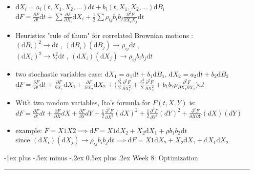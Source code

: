 \documentclass[10pt,landscape,a4paper]{article}
\makeatletter
\renewcommand{\section}{\@startsection{section}{1}{0mm}%
                                {-1ex plus -.5ex minus -.2ex}%
                                {0.5ex plus .2ex}%
                                {\normalfont\large\bfseries}}
\makeatother
\begin{document}
\begin{multicols*}{3}
\begin{description}[topsep=0pt]
	\item[It\^{o}'s lemma: multiple stochastic variables] ~
	\begin{itemize}[topsep=0pt]
		\item  $ \text{d}X_i = a_i(t,X_1,X_2,...) \text{d}t+  b_i(t,X_1,X_2,...)\text{d} B_i $ \\
		 $\text{d} F = \frac{\partial F}{\partial t} \text{d}t + \sum \frac{\partial F}{\partial X_i} \text{d}X_i + \frac{1}{2} \sum \rho_{ij} b_i b_j \frac{\partial ^2 F}{\partial X_i X_j} \text{d}t$ 
		 \item Heuristics "rule of thum" for correlated Brownian motions : \\
		    $ (\text{d}B_i)^2 \rightarrow \text{d}t $ , 
		    $ (\text{d}B_i)(\text{d}B_j) \rightarrow \rho_{ij} \text{d}t$ ,\\ 
		    $ (\text{d}X_i )^2 \rightarrow b^2_i \text{d}t $ ,
		    $ (\text{d}X_i)(\text{d}X_j) \rightarrow \rho_{ij} b_i b_j \text{d} t $ 
		\item two stochastic variables case:  $\text{d}X_1 = a_1 \text{d}t + b_1 \text{d}B_1 $, $\text{d}X_2   = a_2 \text{d}t + b_2 \text{d}B_2 $ \\
			 $\text{d}F =  \frac{\partial F}{\partial t} \text{d}t + \frac{\partial F}{\partial X_1} \text{d}X_1+  \frac{\partial F}{\partial X_2} \text{d}X_2 + \Big( \frac{b_1^2}{2}  \frac{\partial^2 F}{\partial X_1^2} + \frac{b_2^2}{2}  \frac{\partial^2 F}{\partial X_2^2} + b_1 b_2 \rho \frac{\partial^2 F}{\partial X_1 \partial X_2} \Big) \text{d}t $
		 \item With two random variables, Ito's formula for $F(t, X, Y)$ is:
			$dF = \frac{\partial F}{\partial t} dt + \frac{\partial F}{\partial X} dX + \frac{\partial F}{\partial Y} dY + \frac{1}{2} \frac{\partial^2 F}{\partial X^2} (dX)^2  +  \frac{1}{2} \frac{\partial^2 F}{\partial Y^2} (dY)^2 + \frac{\partial^2 F}{\partial X \partial Y} (dX)(dY)
			$
		 \item example: $F=X1X2 \implies \text{d}F = X1 \text{d} X_2 + X_2 \text{d} X_1 + \rho b_1 b_2 \text{d} t $ \\
		 since $(\text{d}X_i)(\text{d}X_j) \rightarrow \rho_{ij} b_i b_j \text{d} t \implies \text{d}F = X1 \text{d} X_2 + X_2 \text{d} X_1 + \text{d}X_1 \text{d}X_2 $

	\end{itemize}
\end{description}

\section{Week 8: Optimization}\smallskip \hrule height 1pt \smallskip


\end{multicols*}
\end{document}
